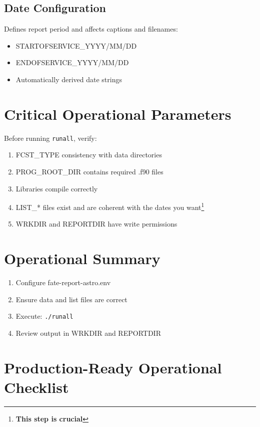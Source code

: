 \documentclass[a4paper,11pt]{article}
\begin{document}
\subsection{Date Configuration}

Defines report period and affects captions and filenames:

\begin{itemize}
    \item STARTOFSERVICE\_YYYY/MM/DD
    \item ENDOFSERVICE\_YYYY/MM/DD
    \item Automatically derived date strings
\end{itemize}

\section{Critical Operational Parameters}

Before running \texttt{runall}, verify:

\begin{enumerate}
    \item FCST\_TYPE consistency with data directories
    \item PROG\_ROOT\_DIR contains required .f90 files
    \item Libraries compile correctly
    \item LIST\_* files exist and are coherent with the dates you want\footnote{\textbf{This step is crucial}}
    \item WRKDIR and REPORTDIR have write permissions
\end{enumerate}

\section{Operational Summary}

\begin{enumerate}
    \item Configure fate-report-astro.env
    \item Ensure data and list files are correct
    \item Execute: \texttt{./runall}
    \item Review output in WRKDIR and REPORTDIR
\end{enumerate}



\newpage
\section{Production-Ready Operational Checklist}
\end{document}
